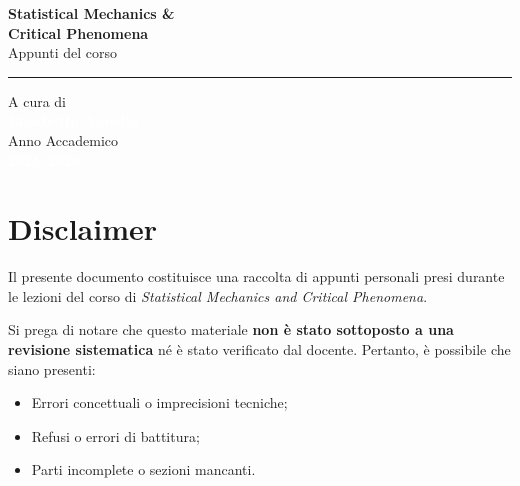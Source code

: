 \documentclass[12pt, a4paper]{book}
\begin{document}
\begin{titlepage}
\begin{flushleft}
        \vspace{4.5cm}
        
        \textcolor{colorE}{\sffamily\fontsize{60}{70}\selectfont\textbf{Statistical Mechanics \&}}\\[0.1cm]
        \textcolor{colorE}{\sffamily\fontsize{60}{70}\selectfont\textbf{Critical Phenomena}}\\[0.6cm]
        \textcolor{white!80}{\sffamily\Large Appunti del corso}\\[0.5cm]
        \textcolor{white!30}{\rule{6cm}{1pt}} %
    \end{flushleft}
    
    \vfill %
    
    \begin{flushleft}
        \textcolor{white!60}{\sffamily\large A cura di}\\[0.2cm]
        \textcolor{white}{\sffamily\huge\textbf{Elisabetta Agnello}}\\[1.2cm]
        
        \textcolor{white!60}{\sffamily\large Anno Accademico}\\[0.2cm]
        \textcolor{white}{\sffamily\Large\textbf{2025/2026}}
    \end{flushleft}
    
    \vspace*{1cm} %
\end{titlepage}
    

\frontmatter %
\chapter*{Disclaimer}
\thispagestyle{empty} %

Il presente documento costituisce una raccolta di appunti personali presi durante le lezioni del corso di \textit{Statistical Mechanics and Critical Phenomena}. 

Si prega di notare che questo materiale \textbf{non è stato sottoposto a una revisione sistematica} né è stato verificato dal docente. Pertanto, è possibile che siano presenti:
\begin{itemize}
    \item Errori concettuali o imprecisioni tecniche;
    \item Refusi o errori di battitura;
    \item Parti incomplete o sezioni mancanti.
\end{itemize}
\end{document}
